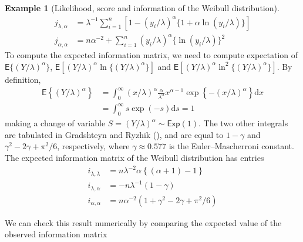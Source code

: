 \documentclass[
  11pt,
  letterpaper,
]{scrbook}
\theoremstyle{definition}
\theoremstyle{definition}
\newtheorem{example}{Example}[chapter]
\theoremstyle{definition}
\theoremstyle{plain}
\theoremstyle{plain}
\theoremstyle{remark}
\begin{document}
\begin{example}[Likelihood, score and information of the Weibull
distribution]
\begin{align*}
j_{\lambda, \alpha} &= \lambda^{-1}\sum_{i=1}^n [1-(y_i/\lambda)^\alpha\{1+\alpha\ln(y_i/\lambda)\}] \\
j_{\alpha,\alpha} &= n\alpha^{-2} + \sum_{i=1}^n (y_i/\lambda)^\alpha \{\ln(y_i/\lambda)\}^2
\end{align*} To compute the expected information matrix, we need to
compute expectation of \(\mathsf{E}\{(Y/\lambda)^\alpha\}\),
\(\mathsf{E}[(Y/\lambda)^\alpha\ln\{(Y/\lambda)^\alpha\}]\) and
\(\mathsf{E}[(Y/\lambda)^\alpha\ln^2\{(Y/\lambda)^\alpha\}]\). By
definition, \begin{align*}
\mathsf{E}\left\{(Y/\lambda)^\alpha\right\} & = \int_0^\infty (x/\lambda)^\alpha \frac{\alpha}{\lambda^\alpha} x^{\alpha-1}\exp\left\{-(x/\lambda)^\alpha\right\} \mathrm{d} x \\
 &= \int_0^\infty s\exp(-s) \mathrm{d} s =1
\end{align*} making a change of variable
\(S = (Y/\lambda)^\alpha\sim \mathsf{Exp}(1)\). The two other integrals
are tabulated in Gradshteyn and Ryzhik
(), and are equal to
\(1-\gamma\) and \(\gamma^2-2\gamma + \pi^2/6\), respectively, where
\(\gamma \approx 0.577\) is the Euler--Mascherroni constant. The
expected information matrix of the Weibull distribution has entries
\begin{align*}
i_{\lambda, \lambda} & = n \lambda^{-2}\alpha\left\{ (\alpha+1)-1\right\} \\
i_{\lambda, \alpha} & = -n\lambda^{-1} (1-\gamma) \\
i_{\alpha, \alpha} & = n\alpha^{-2}(1 + \gamma^2-2\gamma+\pi^2/6)
\end{align*}

We can check this result numerically by comparing the expected value of
the observed information matrix


\end{example}
\end{document}
